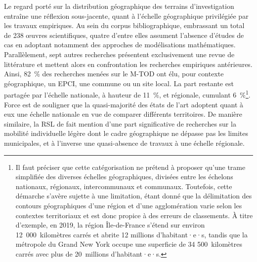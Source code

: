 \begin{refsegment}
Le regard porté sur la distribution géographique des terrains d'investigation entraîne une réflexion sous-jacente, quant à l'échelle géographique privilégiée par les travaux empiriques. Au sein du corpus bibliographique, embrassant un total de 238 œuvres scientifiques, quatre d'entre elles assument l'absence d'études de cas en adoptant notamment des approches de modélisations mathématiques. Parallèlement, sept autres recherches présentent exclusivement une revue de littérature et mettent alors en confrontation les recherches empiriques antérieures. Ainsi, 82~\% des recherches menées sur le \acrshort{M-TOD} ont élu, pour contexte géographique, un \acrfull{EPCI}, une commune ou un site local. La part restante est partagée par l'échelle nationale, à hauteur de 11~\%, et régionale, cumulant 6~\%\footnote{
    Il faut préciser que cette catégorisation ne prétend à proposer qu'une trame simplifiée des diverses échelles géographiques, divisées entre les échelons nationaux, régionaux, intercommunaux et communaux. Toutefois, cette démarche s'avère sujette à une limitation, étant donné que la délimitation des contours géographiques d'une région et d'une agglomération varie selon les contextes territoriaux et est donc propice à des erreurs de classements. À titre d'exemple, en 2019, la région Île-de-France s'étend sur environ 12~000~kilomètres carrés et abrite 12 millions d'habitant·e·s, tandis que la métropole du Grand New York occupe une superficie de 34 500~kilomètres carrés avec plus de 20~millions d'habitant·e·s.
}. Force est de souligner que la quasi-majorité des états de l'art adoptent quant à eux une échelle nationale en vue de comparer différents territoires. De manière similaire, la \acrshort{RSL} de \textcolor{blue}{\textcite[298]{zhang_built_2023}} fait mention d'une part significative de recherches sur la mobilité individuelle légère dont le cadre géographique ne dépasse pas les limites municipales, et à l'inverse une quasi-absence de travaux à une échelle régionale.%


\end{refsegment}
